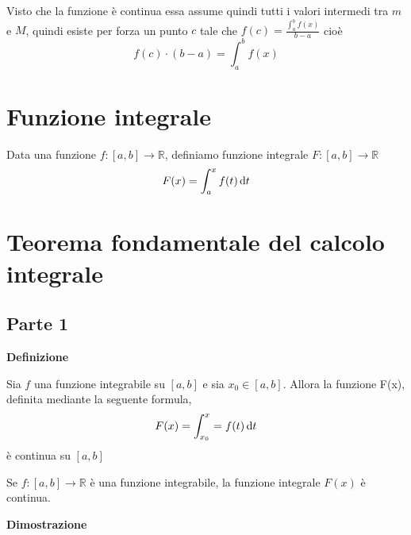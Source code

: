 Visto che la funzione è continua essa assume quindi tutti i valori intermedi tra $m$ e $M$, quindi esiste per forza un punto $c$ tale che $f(c)=\frac{\int_a^b f(x)}{b-a}$ cioè $$f(c)\cdot (b-a) = \int_a^b f(x)$$

\section{Funzione integrale}

Data una funzione $f: [a,b] \to \mathbb{R}$, definiamo funzione integrale $F: [a,b] \to \mathbb{R}$ $$F(x) = \int_a^x f(t) \mathop{}\!\mathrm{d} t$$

\section{Teorema fondamentale del calcolo integrale}

\subsection{Parte 1}

\textbf{Definizione}

Sia $f$ una funzione integrabile su $[a,b]$ e sia $x_0 \in [a,b]$. Allora la funzione F(x), definita mediante la seguente formula, $$F(x) = \int_{x_0}^x = f(t) \mathop{}\!\mathrm{d} t$$ è continua su $[a,b]$

\begin{tip}
Se $f:[a,b] \to \mathbb{R}$ è una funzione integrabile, la funzione integrale $F(x)$ è continua.
\end{tip}

\textbf{Dimostrazione}

